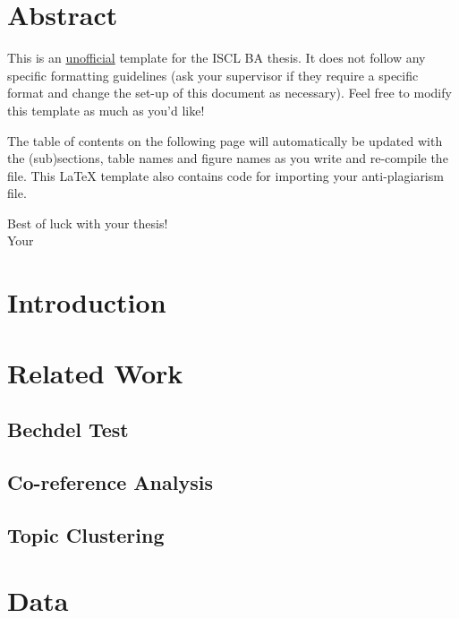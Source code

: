 \documentclass[a4paper]{article}
\begin{document}
% 

\newpage
\section*{Abstract}
This is an \underline{unofficial} template for the ISCL BA thesis. 
It does not follow any specific formatting guidelines (ask your supervisor if they require a specific format and change the set-up of this document as necessary).
Feel free to modify this template as much as you'd like!

The table of contents on the following page will automatically be updated with the (sub)sections, table names and figure names as you write and re-compile the file.
This \LaTeX{} template also contains code for importing your anti-plagiarism file.

Best of luck with your thesis!\\
Your \citeauthor{fachschaft}

\newpage
\tableofcontents
\listoftables
\listoffigures
\newpage


\section{Introduction}
\blindtext{}

\section{Related Work}
\blindtext{}

\subsection{Bechdel Test}
\blindtext{}

\subsection{Co-reference Analysis}
\blindtext{}

\subsection{Topic Clustering}
\blindtext{}

\section{Data}
\blindtext{}
\end{document}
